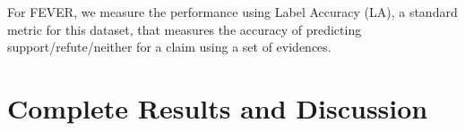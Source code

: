 For FEVER, we measure the performance using Label Accuracy (LA), a standard metric for this dataset, that measures the accuracy of predicting support/refute/neither for a claim using a set of evidences.


\section{Complete Results and Discussion}
\label{app:complete_results}


\begin{table*}[t]
    \centering
    \caption{Complete results of our joint models for AS2 datasets when \textbf{re-ranking the answer candidates ranked in top-k by Pairwise RoBERTa-Base}. MSPP, FT refer to our pre-training task and finetuning respectively. We indicate the prediction head (IE$_k$/AE$_k$) used for both pre-training and finetuning.}
    \label{tab:app_results_as2_topk}
\end{table*}

